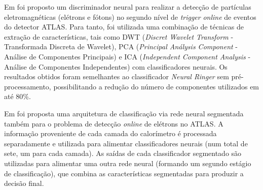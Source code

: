 Em  foi proposto um discriminador neural para realizar a detecção de partículas eletromagnéticas (elétrons e fótons) no segundo nível de \textit{trigger} \textit{online} de eventos do detector ATLAS. Para tanto, foi utilizada uma combinação de técnicas de extração de características, tais como DWT (\textit{Discret Wavelet Transform} - Transformada Discreta de Wavelet), PCA (\textit{Principal Análysis Component} - Análise de Componentes Principais) e ICA (\textit{Independent Component Analysis} - Análise de Componentes Independentes) com classificadores neurais. Os resultados obtidos foram semelhantes ao classificador \textit{Neural Ringer} sem pré-processamento, possibilitando a redução do número de componentes utilizados em até 80\%.

Em  foi proposta uma arquitetura de classificação via rede neural segmentada também para o problema de detecção \textit{online} de elétrons no ATLAS. A informação proveniente de cada camada do calorímetro é processada separadamente e utilizada para alimentar classificadores neurais (num total de sete, um para cada camada). As saídas de cada classificador segmentado são utilizadas para alimentar uma outra rede neural (formando um segundo estágio de classificação), que combina as características segmentadas para produzir a decisão final.


